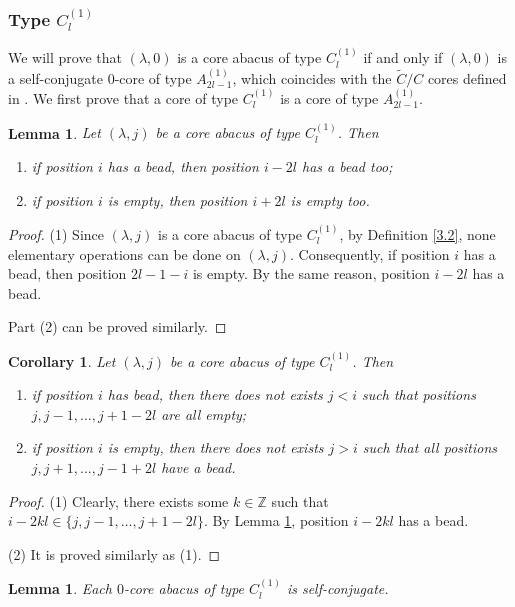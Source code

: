 \documentclass[11pt]{amsart}
\theoremstyle{plain}
\numberwithin{equation}{subsection}
\newtheorem{lemma}[theorem]{Lemma}
\newtheorem{corollary}[theorem]{Corollary}
\newcommand{\lam}{\lambda}
\begin{document}
\subsubsection{Type $C_l^{(1)}$} We will prove that $(\lam, 0)$ is a core abacus of type $C_l^{(1)}$ 
if and only if $(\lam, 0)$ is a self-conjugate $0$-core of type $A_{2l-1}^{(1)}$, which coincides with the $\tilde{C}/C$ cores defined in \cite{HJ2}. 
We first prove that a core of type $C_l^{(1)}$ is a core of type $A_{2l-1}^{(1)}$.
\begin{lemma}\label{3.14}
Let $(\lam, j)$ be a core abacus of type $C_l^{(1)}$. Then
\begin{enumerate}
\item[{\rm (1)}] if position $i$ has a bead, then position $i-2l$ has a bead too; 
\item[{\rm (2)}] if position $i$ is empty, then position $i+2l$ is empty too. 
\end{enumerate}
\end{lemma}

\begin{proof}
(1) Since $(\lam, j)$ is a core abacus of type $C_l^{(1)}$, by Definition \ref{3.2}, none elementary operations can be done on $(\lam, j)$. 
Consequently, if position $i$ has a bead, then position $2l-1-i$ is empty. By the same reason, position $i-2l$ has a bead.

Part (2) can be proved similarly.
\end{proof}
\begin{corollary}\label{3.15}
Let $(\lam, j)$ be a core abacus of type $C_l^{(1)}$. Then 
\begin{enumerate}
\item[{\rm (1)}] if position $i$ has bead, then there does not exists $j<i$ such that positions $j, j-1, \dots, j+1-2l$ are all empty;
\item[{\rm (2)}] if position $i$ is empty, then there does not exists $j>i$ such that all positions $j, j+1, \dots, j-1+2l$ have a bead.
\end{enumerate}
\end{corollary}

\begin{proof}
(1) Clearly, there exists some $k\in \mathbb{Z}$ such that $i-2kl\in\{j, j-1, \dots, j+1-2l\}$. By Lemma \ref{3.14}, position $i-2kl$ has a bead.

(2) It is proved similarly as (1).
\end{proof}

\begin{lemma}\label{3.16}
Each $0$-core abacus of type $C_l^{(1)}$ is self-conjugate.
\end{lemma}
\end{document}
